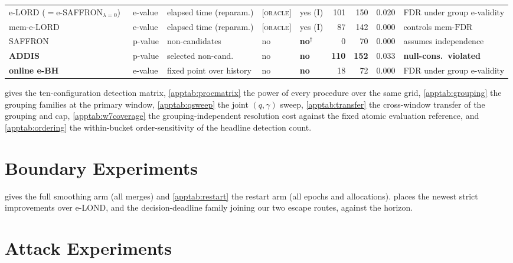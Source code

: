\documentclass[conference]{IEEEtran}
\newcommand{\FDR}{\mathrm{FDR}}
\newcommand{\oracle}{\textsc{[oracle]}}
\begin{document}
\begin{table}[t]
{\begin{tabular}{lllllrrrl}
e-LORD ($=$e-SAFFRON$_{\lambda{=}0}$)~\cite{egai2025} & e-value & elapsed time (reparam.) & \oracle & yes (I) & 101 & 150 & 0.020 & FDR under group e-validity \\
mem-e-LORD~\cite{egai2025}         & e-value & elapsed time (reparam.) & \oracle & yes (I) & 87 & 142 & 0.000 & controls mem-$\FDR$ \\
SAFFRON~\cite{ramdas2018saffron}   & p-value & non-candidates & no & \textbf{no}$^\dagger$ & 0 & 70 & 0.000 & assumes independence \\
\textbf{ADDIS}~\cite{tian2019addis}& p-value & selected non-cand.\ & no & \textbf{no} & \textbf{110} & \textbf{152} & 0.033 & \textbf{null-cons.\ violated} \\
\textbf{online e-BH}~\cite{xu2024elond} & e-value & fixed point over history & no & \textbf{no} & 18 & 72 & 0.000 & FDR under group e-validity \\
\bottomrule
\end{tabular}}
\end{table}

 gives the ten-configuration detection matrix, \cref{apptab:procmatrix} the
power of every procedure over the same grid, \cref{apptab:grouping} the grouping families at the
primary window, \cref{apptab:qsweep} the joint $(q,\gamma)$ sweep, \cref{apptab:transfer} the
cross-window transfer of the grouping and cap, \cref{apptab:w7coverage} the
grouping-independent resolution cost against the fixed atomic evaluation reference, and
\cref{apptab:ordering} the within-bucket order-sensitivity of the headline detection count.








\section{Boundary Experiments}\label{app:boundary}
 gives the full smoothing arm (all merges) and \cref{apptab:restart} the
restart arm (all epochs and allocations).  places the newest strict improvements
over e-LOND, and the decision-deadline family joining our two escape routes, against the horizon.




\section{Attack Experiments}\label{app:attacks}
\end{document}
